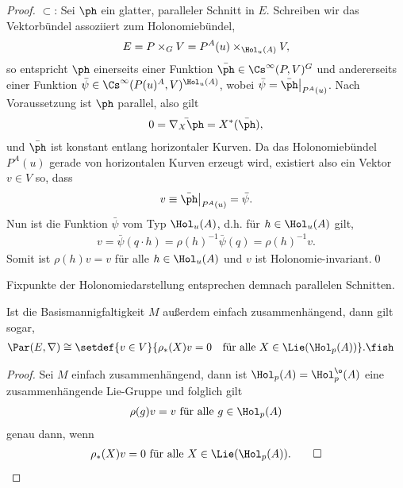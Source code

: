 \documentclass[%
	paper=a5,%
	fleqn,%
	DIV=18,%
	BCOR=0mm,
	fontsize=11pt,
	titlepage=false,%
	bibliography=totoc,
	DIV=18,%
	twoside=true,
	pdftitle=Riemannsche Geometrie,
	pdfauthor=Uwe Semmelmann,
	numbers=noendperiod]%
	{scrbook}
\begin{document}
\begin{proof}
$\subset$: Sei $\ph$ ein glatter, paralleler Schnitt in $E$. Schreiben wir das Vektorbündel assoziiert zum Holonomiebündel,
\begin{align*}
E = P\times_{G} V = P^A(u) \times_{\Hol_{u}(A)}V,
\end{align*}
so entspricht $\ph$ einerseits einer Funktion $\bar{\ph} \in\Cs^\infty(P,V)^G$ und andererseits einer Funktion $\bar{\psi}\in \Cs^\infty(P(u)^A,V)^{\Hol_{u}(A)}$, wobei $\bar{\psi} = \bar{\ph}\big|_{P^A(u)}$. Nach Voraussetzung ist $\ph$ parallel, also gilt
\begin{align*}
0 = \bar{\nabla_{X}\ph} = X^*(\bar{\ph}),
\end{align*}
und $\bar{\ph}$ ist konstant entlang horizontaler Kurven. Da das Holonomiebündel $P^A(u)$ gerade von horizontalen Kurven erzeugt wird, existiert also ein Vektor $v\in V$ so, dass
\begin{align*}
v \equiv \bar{\ph}\big|_{P^A(u)} = \bar{\psi}.
\end{align*}
Nun ist die Funktion $\bar{\psi}$ vom Typ $\Hol_{u}(A)$, d.h. für $h\in\Hol_{u}(A)$ gilt,
\begin{align*}
v = \bar{\psi}(q\cdot h) = \rho(h)^{-1}\bar{\psi}(q) = \rho(h)^{-1}v.
\end{align*}
Somit ist $\rho(h)v = v$ für alle $h\in \Hol_{u}(A)$ und $v$ ist Holonomie-invariant.\qed
\end{proof}

Fixpunkte der Holonomiedarstellung entsprechen demnach parallelen Schnitten.

\begin{prop}[Zusatz]
Ist die Basismannigfaltigkeit $M$ außerdem einfach zusammenhängend, dann gilt sogar,
\begin{align*}
\Par(E,\nabla) &\cong \setdef{v\in V}{\rho_{*}(X)v = 0\quad \text{für alle }X\in \Lie(\Hol_{p}(A))}.\fish
\end{align*}
\end{prop}
\begin{proof}
Sei $M$ einfach zusammenhängend, dann ist $\Hol_{p}(A) = \Hol_{p}^\o(A)$ eine zusammenhängende Lie-Gruppe und folglich gilt
\begin{align*}
\rho(g)v = v \text{ für alle } g\in \Hol_{p}(A)
\end{align*}
genau dann, wenn
\begin{align*}
\rho_{*}(X)v = 0\text{ für alle } X\in \Lie(\Hol_{p}(A)).\qed
\end{align*}
\end{proof}
\end{document}
